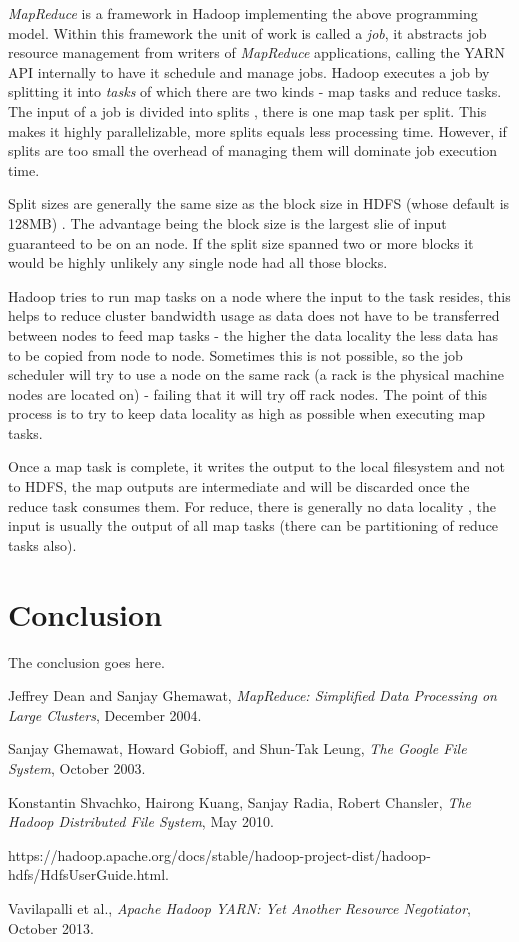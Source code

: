 \documentclass[conference]{IEEEtran}
\begin{document}
\emph{MapReduce} is a framework in Hadoop implementing the above programming model. Within this framework the unit of work is called a \emph{job}, it abstracts job resource management from writers of \emph{MapReduce} applications, calling the YARN API internally to have it schedule and manage jobs. Hadoop executes a job by splitting it into \emph{tasks} of which there are two kinds - map tasks and reduce tasks. The input of a job is divided into splits \cite{mapreduce}, there is one map task per split. This makes it highly parallelizable, more splits equals less processing time. However, if splits are too small the overhead of managing them will dominate job execution time.

Split sizes are generally the same size as the block size in HDFS (whose default is 128MB) \cite{hdfs}. The advantage being the block size is the largest slie of input guaranteed to be on an node. If the split size spanned two or more blocks it would be highly unlikely any single node had all those blocks.

Hadoop tries to run map tasks on a node where the input to the task resides, this helps to reduce cluster bandwidth usage as data does not have to be transferred between nodes to feed map tasks - the higher the data locality the less data has to be copied from node to node. Sometimes this is not possible, so the job scheduler will try to use a node on the same rack (a rack is the physical machine nodes are located on) - failing that it will try off rack nodes. The point of this process is to try to keep data locality as high as possible when executing map tasks.

Once a map task is complete, it writes the output to the local filesystem and not to HDFS, the map outputs are intermediate and will be discarded once the reduce task consumes them. For reduce, there is generally no data locality , the input is usually the output of all map tasks (there can be partitioning of reduce tasks also).

\section{Conclusion}
The conclusion goes here.


\begin{thebibliography}{1}
Jeffrey Dean and Sanjay Ghemawat, \emph{MapReduce: Simplified Data Processing on Large Clusters}, December 2004.

Sanjay Ghemawat, Howard Gobioff, and Shun-Tak Leung, \emph{The Google File System}, October 2003.

Konstantin Shvachko, Hairong Kuang, Sanjay Radia, Robert Chansler, \emph{The Hadoop Distributed File System},  May 2010.

https://hadoop.apache.org/docs/stable/hadoop-project-dist/hadoop-hdfs/HdfsUserGuide.html.

Vavilapalli et al., \emph{Apache Hadoop YARN: Yet Another Resource Negotiator}, October 2013.

\end{thebibliography}
\end{document}
